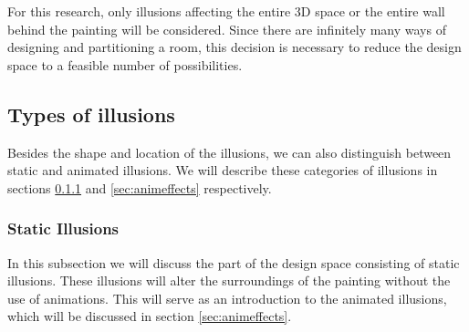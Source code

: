 \documentclass[a4paper]{article}
\begin{document}
For this research, only illusions affecting the entire 3D space or the entire wall behind the painting will be considered. Since there are infinitely many ways of designing and partitioning a room, this decision is necessary to reduce the design space to a feasible number of possibilities. 

\subsection {Types of illusions}
Besides the shape and location of the illusions, we can also distinguish between static and animated illusions. We will describe these categories of illusions in sections \ref{sec:stateffects} and \ref{sec:animeffects} respectively.

\subsubsection{Static Illusions}\label{sec:stateffects}

In this subsection we will discuss the part of the design space consisting of static illusions. These illusions will alter the surroundings of the painting without the use of animations. This will serve as an introduction to the animated illusions, which will be discussed in section \ref{sec:animeffects}.
\end{document}
